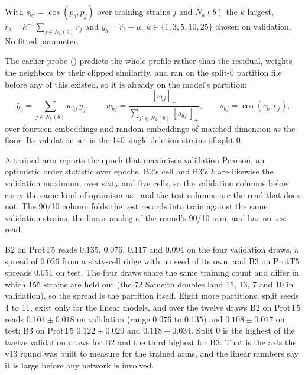  With $s_{bj} = \cos(p_b, p_j)$ over training strains $j$ and
$N_k(b)$ the $k$ largest, $\hat{r}_b = k^{-1} \sum_{j \in N_k(b)} r_j$ and
$\hat{y}_b = \hat{r}_b + \mu$, $k \in \{1, 3, 5, 10, 25\}$ chosen on validation. No fitted
parameter.

 The earlier probe
() predicts the whole profile rather than the residual,
weights the neighbors by their clipped similarity, and ran on the split-0 partition file
before any of this existed, so it is already on the model's partition:
%
\begin{equation}
  \hat{y}_b = \sum_{j \in N_k(b)} w_{bj}\, y_j,
  \qquad
  w_{bj} = \frac{[s_{bj}]_+}{\sum_{j' \in N_k(b)} [s_{bj'}]_+},
  \qquad
  s_{bj} = \cos(e_b, e_j),
  \label{eq:knn}
\end{equation}
%
over fourteen embeddings and random embeddings of matched dimension as the floor. Its
validation set is the 140 single-deletion strains of split 0.

 A trained arm reports the epoch that maximizes
validation Pearson, an optimistic order statistic over epochs. B2's cell and B3's $k$ are
likewise the validation maximum, over sixty and five cells, so the validation columns below
carry the same kind of optimism as , and the test columns are the read that
does not. The 90/10 column folds the test records into train against the same validation
strains, the linear analog of the round's 90/10 arm, and has no test read.





 B2 on ProtT5
reads $0.135$, $0.076$, $0.117$ and $0.094$ on the four validation draws, a spread of
$0.026$ from a sixty-cell ridge with no seed of its own, and B3 on ProtT5 spreads $0.051$ on
test. The four draws share the same training count and differ in which 155 strains are
held out (the 72 Sameith doubles land 15, 13, 7 and 10 in validation), so the spread is the
partition itself. Eight more partitions, split seeds 4 to 11, exist only for the linear
models, and over the twelve draws B2 on ProtT5 reads $0.104 \pm 0.018$ on validation
(range $0.076$ to $0.135$) and $0.108 \pm 0.017$ on test; B3 on ProtT5 $0.122 \pm 0.020$
and $0.118 \pm 0.034$. Split 0 is the highest of the twelve validation draws for B2 and the
third highest for B3. That is the axis the v13 round was built to measure for the trained
arms, and the linear numbers say it is large before any network is involved.

